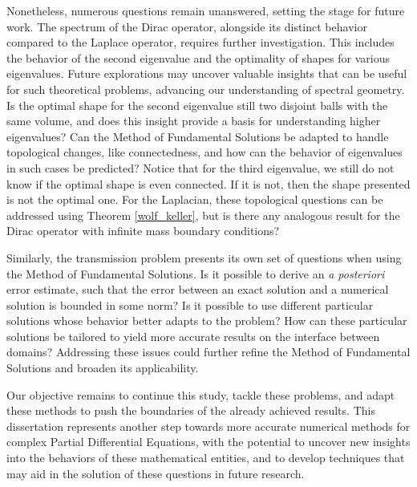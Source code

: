Nonetheless, numerous questions remain unanswered, setting the stage for future work. The spectrum of the Dirac operator, alongside its distinct behavior compared to the Laplace operator, requires further investigation. This includes the behavior of the second eigenvalue and the optimality of shapes for various eigenvalues. Future explorations may uncover valuable insights that can be useful for such theoretical problems, advancing our understanding of spectral geometry. Is the optimal shape for the second eigenvalue still two disjoint balls with the same volume, and does this insight provide a basis for understanding higher eigenvalues? Can the Method of Fundamental Solutions be adapted to handle topological changes, like connectedness, and how can the behavior of eigenvalues in such cases be predicted? Notice that for the third eigenvalue, we still do not know if the optimal shape is even connected. If it is not, then the shape presented is not the optimal one. For the Laplacian, these topological questions can be addressed using Theorem \ref{wolf_keller}, but is there any analogous result for the Dirac operator with infinite mass boundary conditions?

Similarly, the transmission problem presents its own set of questions when using the Method of Fundamental Solutions. Is it possible to derive an \textit{a posteriori} error estimate, such that the error between an exact solution and a numerical solution is bounded in some norm? Is it possible to use different particular solutions whose behavior better adapts to the problem? How can these particular solutions be tailored to yield more accurate results on the interface between domains? Addressing these issues could further refine the Method of Fundamental Solutions and broaden its applicability. 

Our objective remains to continue this study, tackle these problems, and adapt these methods to push the boundaries of the already achieved results. This dissertation represents another step towards more accurate numerical methods for complex Partial Differential Equations, with the potential to uncover new insights into the behaviors of these mathematical entities, and to develop techniques that may aid in the solution of these questions in future research.